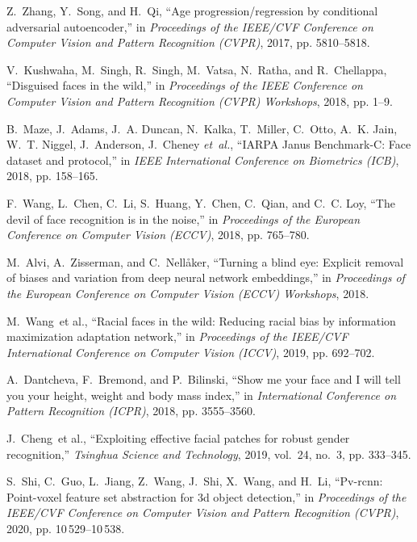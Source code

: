 \documentclass[journal]{IEEEtran}
\begin{document}
\begin{thebibliography}{100}
Z.~Zhang, Y.~Song, and H.~Qi, ``Age progression/regression by conditional adversarial autoencoder,'' in \emph{Proceedings of the IEEE/CVF Conference on Computer Vision and Pattern Recognition (CVPR)}, 2017, pp. 5810--5818.

V.~Kushwaha, M.~Singh, R.~Singh, M.~Vatsa, N.~Ratha, and R.~Chellappa, ``Disguised faces in the wild,'' in \emph{Proceedings of the IEEE Conference on Computer Vision and Pattern Recognition (CVPR) Workshops}, 2018, pp. 1--9.

B.~Maze, J.~Adams, J.~A. Duncan, N.~Kalka, T.~Miller, C.~Otto, A.~K. Jain,
  W.~T. Niggel, J.~Anderson, J.~Cheney \emph{et~al.}, ``IARPA Janus Benchmark-C: Face dataset and protocol,'' in \emph{IEEE International Conference on Biometrics (ICB)}, 2018, pp. 158--165.

F.~Wang, L.~Chen, C.~Li, S.~Huang, Y.~Chen, C.~Qian, and C.~C. Loy, ``The devil of face recognition is in the noise,'' in \emph{Proceedings of the European
  Conference on Computer Vision (ECCV)}, 2018, pp. 765--780.

M.~Alvi, A.~Zisserman, and C.~Nell{\aa}ker, ``Turning a blind eye: Explicit removal of biases and variation from deep neural network embeddings,'' in
  \emph{Proceedings of the European Conference on Computer Vision (ECCV) Workshops}, 2018.

M.~Wang~et al., ``Racial faces in the wild: Reducing racial bias by information maximization adaptation network,'' in \emph{Proceedings of the IEEE/CVF International Conference on Computer Vision (ICCV)}, 2019, pp. 692--702.

A.~Dantcheva, F.~Bremond, and P.~Bilinski, ``Show me your face and I will tell you your height, weight and body mass index,'' in \emph{International Conference on Pattern Recognition (ICPR)}, 2018, pp. 3555--3560.

J.~Cheng~et al., ``Exploiting effective facial patches for robust gender recognition,'' \emph{Tsinghua Science and Technology}, 2019, vol.~24, no.~3, pp.
  333--345.

S.~Shi, C.~Guo, L.~Jiang, Z.~Wang, J.~Shi, X.~Wang, and H.~Li, ``Pv-rcnn: Point-voxel feature set abstraction for 3d object detection,'' in \emph{Proceedings of the IEEE/CVF Conference on Computer Vision and Pattern Recognition (CVPR)}, 2020, pp. 10\,529--10\,538.


\end{thebibliography}
\end{document}
